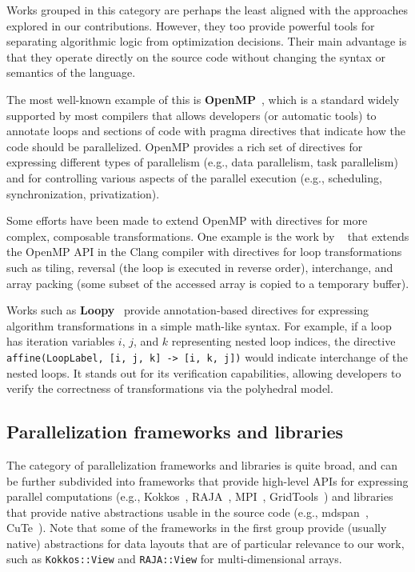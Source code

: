 Works grouped in this category are perhaps the least aligned with the approaches explored in our contributions. However, they too provide powerful tools for separating algorithmic logic from optimization decisions. Their main advantage is that they operate directly on the source code without changing the syntax or semantics of the language.

The most well-known example of this is \textbf{OpenMP}~\cite{dagum1998openmp}, which is a standard widely supported by most compilers that allows developers (or automatic tools) to annotate loops and sections of code with pragma directives that indicate how the code should be parallelized. OpenMP provides a rich set of directives for expressing different types of parallelism (e.g., data parallelism, task parallelism) and for controlling various aspects of the parallel execution (e.g., scheduling, synchronization, privatization).

Some efforts have been made to extend OpenMP with directives for more complex, composable transformations. One example is the work by \citeauthor{kruse2018user}~\cite{kruse2018user} that extends the OpenMP API in the Clang compiler with directives for loop transformations such as tiling, reversal (the loop is executed in reverse order), interchange, and array packing (some subset of the accessed array is copied to a temporary buffer).

Works such as \textbf{Loopy}~\cite{namjoshi2016loopy} provide annotation-based directives for expressing algorithm transformations in a simple math-like syntax. For example, if a loop has iteration variables $i$, $j$, and $k$ representing nested loop indices, the directive \texttt{affine(LoopLabel, {[i, j, k] -> [i, k, j]})} would indicate interchange of the nested loops. It stands out for its verification capabilities, allowing developers to verify the correctness of transformations via the polyhedral model.


\subsection{Parallelization frameworks and libraries}\label{sec:parallelization-frameworks}

The category of parallelization frameworks and libraries is quite broad, and can be further subdivided into frameworks that provide high-level APIs for expressing parallel computations (e.g., Kokkos~\cite{trott2021kokkos}, RAJA~\cite{beckingsale2019raja}, MPI~\cite{mpi-5.0}, GridTools~\cite{afanasyev2021gridtools}) and libraries that provide native abstractions usable in the source code (e.g., mdspan~\cite{trott2022mdspan}, CuTe~\cite{thakkar2023cutlass}). Note that some of the frameworks in the first group provide (usually native) abstractions for data layouts that are of particular relevance to our work, such as \lstinline{Kokkos::View} and \lstinline{RAJA::View} for multi-dimensional arrays.

